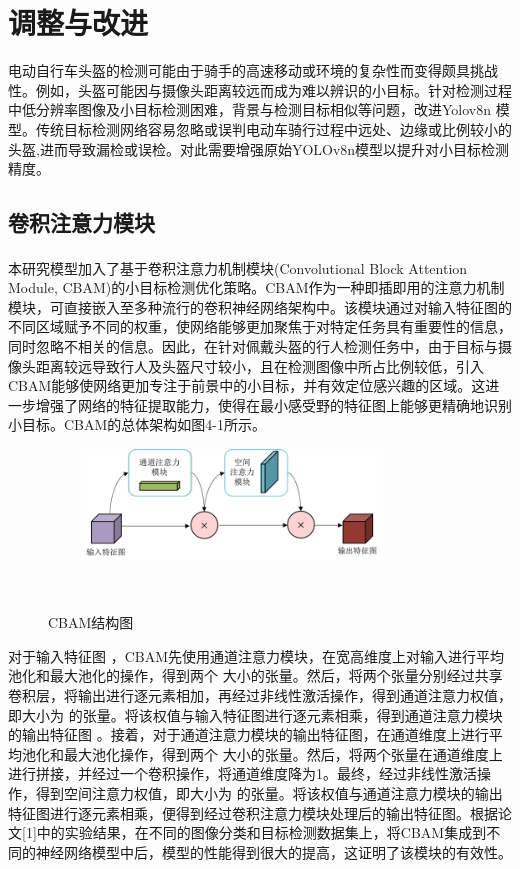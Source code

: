 \documentclass[journal]{IEEEtran}
\begin{document}
\section{调整与改进}
电动自行车头盔的检测可能由于骑手的高速移动或环境的复杂性而变得颇具挑战性。例如，头盔可能因与摄像头距离较远而成为难以辨识的小目标。针对检测过程中低分辨率图像及小目标检测困难，背景与检测目标相似等问题，改进Yolov8n 模型。传统目标检测网络容易忽略或误判电动车骑行过程中远处、边缘或比例较小的头盔,进而导致漏检或误检。对此需要增强原始YOLOv8n模型以提升对小目标检测精度。\par

\subsection{卷积注意力模块}
本研究模型加入了基于卷积注意力机制模块\textsuperscript{\cite{1}}(Convolutional Block Attention Module, CBAM)的小目标检测优化策略。CBAM作为一种即插即用的注意力机制模块，可直接嵌入至多种流行的卷积神经网络架构中。该模块通过对输入特征图的不同区域赋予不同的权重，使网络能够更加聚焦于对特定任务具有重要性的信息，同时忽略不相关的信息。因此，在针对佩戴头盔的行人检测任务中，由于目标与摄像头距离较远导致行人及头盔尺寸较小，且在检测图像中所占比例较低，引入CBAM能够使网络更加专注于前景中的小目标，并有效定位感兴趣的区域。这进一步增强了网络的特征提取能力，使得在最小感受野的特征图上能够更精确地识别小目标。CBAM的总体架构如图4-1所示。\par
\begin{figure}[htbp] 

   \centering
   \includegraphics[width=8cm]{figures/4_1.png}
   \caption{CBAM结构图} 
   \label{fig:} 
  
\end{figure} 
对于输入特征图 ，CBAM先使用通道注意力模块，在宽高维度上对输入进行平均池化和最大池化的操作，得到两个 大小的张量。然后，将两个张量分别经过共享卷积层，将输出进行逐元素相加，再经过非线性激活操作，得到通道注意力权值，即大小为 的张量。将该权值与输入特征图进行逐元素相乘，得到通道注意力模块的输出特征图 。接着，对于通道注意力模块的输出特征图，在通道维度上进行平均池化和最大池化操作，得到两个 大小的张量。然后，将两个张量在通道维度上进行拼接，并经过一个卷积操作，将通道维度降为1。最终，经过非线性激活操作，得到空间注意力权值，即大小为 的张量。将该权值与通道注意力模块的输出特征图进行逐元素相乘，便得到经过卷积注意力模块处理后的输出特征图。根据论文[1]中的实验结果，在不同的图像分类和目标检测数据集上，将CBAM集成到不同的神经网络模型中后，模型的性能得到很大的提高，这证明了该模块的有效性。\par
\end{document}
